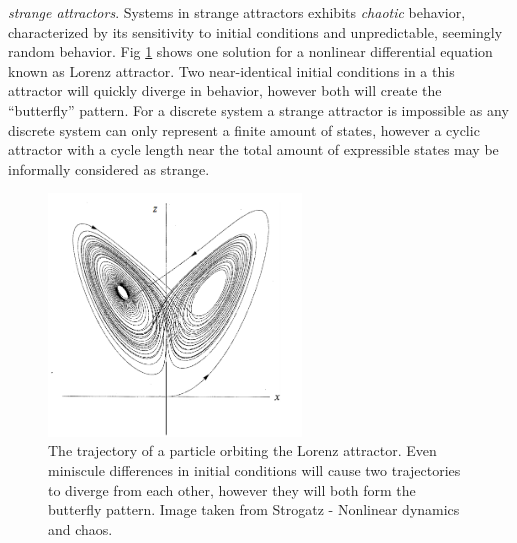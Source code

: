 \emph{strange attractors}.
Systems in strange attractors exhibits \emph{chaotic} behavior, characterized by
its sensitivity to initial conditions and unpredictable, seemingly random
behavior.
Fig \ref{figStrange} shows one solution for a nonlinear differential equation known
as Lorenz attractor.
Two near-identical initial conditions in a this attractor will quickly diverge in
behavior, however both will create the ``butterfly'' pattern.
For a discrete system a strange attractor is impossible as any discrete system
can only represent a finite amount of states, however a cyclic attractor with a
cycle length near the total amount of expressible states may be informally
considered as strange.
% 
\begin{figure}[h!]
  \centering
  \includegraphics[width=0.6\textwidth]{fig/strange.png}
  \caption{
    The trajectory of a particle orbiting the Lorenz attractor.
    Even miniscule differences in initial conditions will cause two trajectories
    to diverge from each other, however they will both form the butterfly
    pattern.
    Image taken from Strogatz - Nonlinear dynamics and chaos.
  }
  \label{figStrange}
\end{figure}
%
